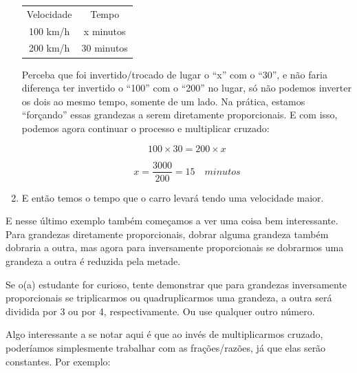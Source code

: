 \begin{exemplo}
\begin{enumerate}
        \begin{table}[H]
            \centering
            \begin{tabular}{cc}
                Velocidade & Tempo \\
                100 km/h & x minutos\\
                200 km/h & 30 minutos
            \end{tabular}

        \end{table}

        Perceba que foi invertido/trocado de lugar o ``x'' com o ``30'', e não faria diferença ter invertido o ``100'' com o ``200'' no lugar, só não podemos inverter os dois ao mesmo tempo, somente de um lado. Na prática, estamos ``forçando'' essas grandezas a serem diretamente proporcionais. E com isso, podemos agora continuar o processo e multiplicar cruzado:

        \begin{equation}
            100\times30=200\times x
        \end{equation}

        \begin{equation}
            x=\frac{3000}{200}=15 \quad minutos
        \end{equation}

        \item E então temos o tempo que o carro levará tendo uma velocidade maior.
    \end{enumerate}
\end{exemplo}

E nesse último exemplo também começamos a ver uma coisa bem interessante. Para grandezas diretamente proporcionais, dobrar alguma grandeza também dobraria a outra, mas agora para inversamente proporcionais se dobrarmos uma grandeza a outra é reduzida pela metade. 

Se o(a) estudante for curioso, tente demonstrar que para grandezas inversamente proporcionais se triplicarmos ou quadruplicarmos uma grandeza, a outra será dividida por 3 ou por 4, respectivamente. Ou use qualquer outro número.

Algo interessante a se notar aqui é que ao invés de multiplicarmos cruzado, poderíamos simplesmente trabalhar com as frações/razões, já que elas serão constantes. Por exemplo:

